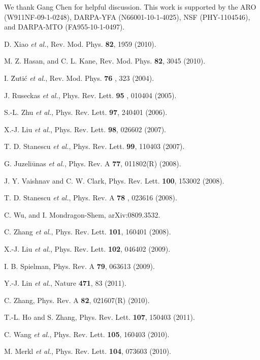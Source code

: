 \documentclass[prl,twocolumn,showpacs,floatfix]{revtex4}
\begin{document}
We thank Gang Chen for helpful discussion. This work is supported by the ARO
(W911NF-09-1-0248), DARPA-YFA (N66001-10-1-4025), NSF (PHY-1104546), and
DARPA-MTO (FA955-10-1-0497).

\begin{thebibliography}{99}
 D. Xiao \textit{et al.}, Rev. Mod. Phys. \textbf{82}, 1959
(2010).

 M. Z. Hasan, and C. L. Kane, Rev. Mod. Phys. \textbf{82}, 3045
(2010).

 I. \u{Z}uti\'{c} \textit{et al.}, Rev. Mod. Phys. \textbf{76}%
, 323 (2004).

 J. Ruseckas \textit{et al.}, Phys. Rev. Lett. \textbf{95}%
, 010404 (2005).

 S.-L. Zhu \textit{et al.}, Phys. Rev. Lett. \textbf{97},
240401 (2006).

 X.-J. Liu \textit{et al.}, Phys. Rev. Lett. \textbf{98},
026602 (2007).

 T. D. Stanescu \textit{et al.}, Phys. Rev. Lett. \textbf{%
99}, 110403 (2007).

 G. Juzeli\={u}nas \textit{et al.}, Phys. Rev. A \textbf{%
77}, 011802(R) (2008).

 J. Y. Vaishnav and C. W. Clark, Phys. Rev. Lett. \textbf{%
100}, 153002 (2008).

 T. D. Stanescu \textit{et al.}, Phys. Rev. A \textbf{78}%
, 023616 (2008).

 C. Wu, and I. Mondragon-Shem, arXiv:0809.3532.

 C. Zhang \textit{et al.}, Phys. Rev. Lett. \textbf{101},
160401 (2008).

 X.-J. Liu \textit{et al.}, Phys. Rev. Lett. \textbf{102},
046402 (2009).

 I. B. Spielman, Phys. Rev. A \textbf{79}, 063613 (2009).

 Y.-J. Lin \textit{et al.}, Nature \textbf{471}, 83 (2011).

 C. Zhang, Phys. Rev. A \textbf{82}, 021607(R) (2010).

 T.-L. Ho and S. Zhang, Phys. Rev. Lett. \textbf{107}, 150403
(2011).

 C. Wang \textit{et al.}, Phys. Rev. Lett. \textbf{105},
160403 (2010).

 M. Merkl \textit{et al.}, Phys. Rev. Lett. \textbf{104},
073603 (2010).


\end{thebibliography}
\end{document}
